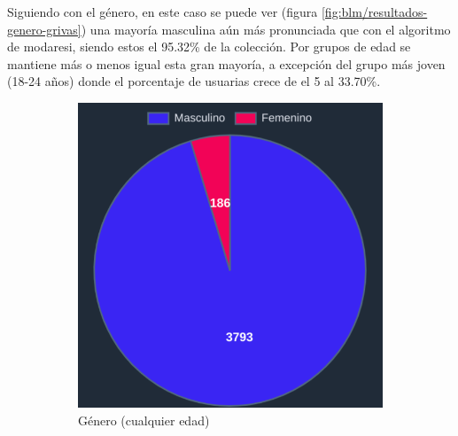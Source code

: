 Siguiendo con el género, en este caso se puede ver (figura \ref{fig:blm/resultados-genero-grivas}) una mayoría masculina aún más pronunciada que con el algoritmo de modaresi, siendo estos el 95.32\% de la colección. Por grupos de edad se mantiene más o menos igual esta gran mayoría, a excepción del grupo más joven (18-24 años) donde el porcentaje de usuarias crece de el 5 al 33.70\%.
\begin{figure}[H]
  \centering
  \begin{subfigure}{0.3\textwidth}
   \includegraphics[width=\textwidth]{imaxes/capturas-app/graficos/grivas/grafico-genero.png}
  \caption{Género (cualquier edad)}
  \label{subfig:blm/resultados-genero-grivas}
  \end{subfigure}
  \begin{subfigure}{0.3\textwidth}

\end{subfigure}
\end{figure}
